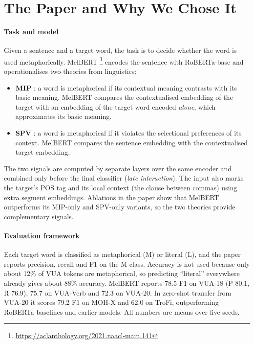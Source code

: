 \documentclass[11pt]{article}
\begin{document}
\section{The Paper and Why We Chose It}
\label{sec:paper}

\paragraph{Task and model} Given a sentence and a target word, the task is to decide whether the word is used metaphorically. MelBERT \citep{choi-etal-2021-melbert}\footnote{\url{https://aclanthology.org/2021.naacl-main.141}} encodes the sentence with RoBERTa-base \citep{liu2019roberta} and operationalises two theories from linguistics:
\begin{itemize}
\item \textbf{MIP} \citep{pragglejaz2007mip,steen2010method}: a word is metaphorical if its contextual meaning contrasts with its basic meaning. MelBERT compares the contextualised embedding of the target with an embedding of the target word encoded \emph{alone}, which approximates its basic meaning.
\item \textbf{SPV} \citep{wilks1978making}: a word is metaphorical if it violates the selectional preferences of its context. MelBERT compares the sentence embedding with the contextualised target embedding.
\end{itemize}
The two signals are computed by separate layers over the same encoder and combined only before the final classifier (\emph{late interaction}). The input also marks the target's POS tag and its local context (the clause between commas) using extra segment embeddings. Ablations in the paper show that MelBERT outperforms its MIP-only and SPV-only variants, so the two theories provide complementary signals.

\paragraph{Evaluation framework} Each target word is classified as metaphorical (M) or literal (L), and the paper reports precision, recall and F1 on the M class. Accuracy is not used because only about 12\% of VUA tokens are metaphorical, so predicting ``literal'' everywhere already gives about 88\% accuracy. MelBERT reports 78.5 F1 on VUA-18 (P 80.1, R 76.9), 75.7 on VUA-Verb and 72.3 on VUA-20. In zero-shot transfer from VUA-20 it scores 79.2 F1 on MOH-X and 62.0 on TroFi, outperforming RoBERTa baselines and earlier models. All numbers are means over five seeds.
\end{document}
